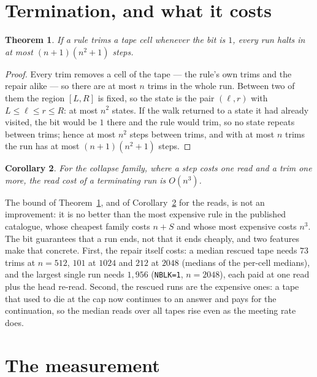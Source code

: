 \documentclass[11pt]{article}
\newtheorem{theorem}{Theorem}
\newtheorem{corollary}[theorem]{Corollary}
\theoremstyle{remark}
\begin{document}
\section{Termination, and what it costs}\label{sec:term}

\begin{theorem}\label{thm:term}
If a rule trims a tape cell whenever the bit is $1$, every run halts in at most $(n+1)(n^{2}+1)$ steps.
\end{theorem}
\begin{proof}
Every trim removes a cell of the tape --- the rule's own trims and the repair alike --- so there are at
most $n$ trims in the whole run. Between two of them the region $[L,R]$ is fixed, so the state is the pair
$(\ell,r)$ with $L\le\ell\le r\le R$: at most $n^{2}$ states. If the walk returned to a state it had already visited, the
bit would be $1$ there and the rule would trim, so no state repeats between trims; hence at most $n^{2}$
steps between trims, and with at most $n$ trims the run has at most $(n+1)(n^{2}+1)$ steps.
\end{proof}

\begin{corollary}\label{cor:cost}
For the collapse family, where a step costs one read and a trim one more, the read cost of a terminating run
is $O(n^{3})$.
\end{corollary}

The bound of Theorem~\ref{thm:term}, and of Corollary~\ref{cor:cost} for the reads, is not an
improvement: it is no better than the most expensive rule in the published catalogue, whose cheapest
family costs $n+S$ and whose most expensive costs $n^{3}$. The bit guarantees that a run ends, not that it
ends cheaply, and two features make that concrete. First, the repair itself costs: a median rescued tape
needs $73$ trims at $n=512$, $101$ at $1024$ and $212$ at $2048$ (medians of the per-cell medians), and the largest single run needs $1{,}956$ (\texttt{NBLK=1}, $n=2048$), each paid at one read
plus the head re-read. Second, the rescued runs are the expensive ones: a tape that used to die at the cap
now continues to an answer and pays for the continuation, so the median reads over all tapes rise even as
the meeting rate does.

\section{The measurement}\label{sec:measure}
\end{document}
